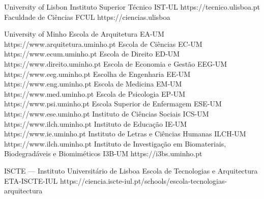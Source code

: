 \begin{ntUnivesity}{University of Lisbon}
                  {Instituto Superior Técnico}%
                  {IST-UL}%
                  {https://tecnico.ulisboa.pt}
                  {Faculdade de Ciências}%
                  {FCUL}%
                  {https://ciencias.ulisboa}
\end{ntUnivesity}

\begin{ntUnivesity}{University of Minho}
                  {Escola de Arquitetura}%
                  {EA-UM}%
                  {https://www.arquitetura.uminho.pt}
                  {Escola de Ciências}%
                  {EC-UM}%
                  {https://www.ecum.uminho.pt}
                  {Escola de Direito}%
                  {ED-UM}%
                  {https://www.direito.uminho.pt}
                  {Escola de Economia e Gestão}%
                  {EEG-UM}%
                  {https://www.eeg.uminho.pt}
                  {Escolha de Engenharia}%
                  {EE-UM}%
                  {https://www.eng.uminho.pt}
                  {Escola de Medicina}%
                  {EM-UM}%
                  {https://www.med.uminho.pt}
                  {Escola de Psicologia}%
                  {EP-UM}%
                  {https://www.psi.uminho.pt}
                  {Escola Superior de Enfermagem}%
                  {ESE-UM}%
                  {https://www.ese.uminho.pt}
                  {Instituto de Ciências Sociais}%
                  {ICS-UM}%
                  {https://www.ilch.uminho.pt}
                  {Instituto de Educação}%
                  {IE-UM}%
                  {https://www.ie.uminho.pt}
                  {Instituto de Letras e Ciências Humanas}%
                  {ILCH-UM}%
                  {https://www.ilch.uminho.pt}
                  {Instituto de Investigação em Biomateriais, Biodegradáveis e Biomiméticos}%
                  {I3B-UM}%
                  {https://i3bs.uminho.pt}
\end{ntUnivesity}

\begin{ntUnivesity}{ISCTE — Instituto Universitário de Lisboa}
             {Escola de Tecnologias e Arquitectura}%
             {ETA-ISCTE-IUL}%
             {https://ciencia.iscte-iul.pt/schools/escola-tecnologias-arquitectura}%
\end{ntUnivesity}

